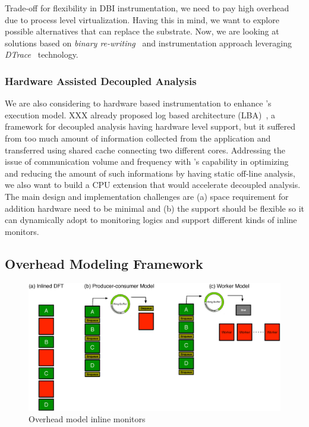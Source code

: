 Trade-off for flexibility in DBI instrumentation, we need to pay high
overhead due to process level virtualization. Having this in mind, we want to
explore possible alternatives that can replace the substrate. Now, we are
looking at solutions based on {\it binary re-writing}~\cite{cfi, rewriting} and
instrumentation approach leveraging {\it DTrace}~\cite{} technology.

\subsubsection{Hardware Assisted Decoupled Analysis} 
\label{}

We are also considering to hardware based instrumentation to enhance
\sreplica's execution model. XXX \etal already proposed log based architecture
(LBA)~\cite{lba}, a framework for decoupled analysis having hardware level
support, but it suffered from too much amount of information collected from the
application and transferred using shared cache connecting two different cores.
%
Addressing the issue of communication volume and frequency with \sreplica's
capability in optimizing and reducing the amount of such informations by having
static off-line analysis, we also want to build a CPU extension that would
accelerate decoupled analysis. 
%
The main design and implementation challenges are (a) space requirement for
addition hardware need to be minimal and (b) the support should be flexible so
it can dynamically adopt to monitoring logics and support different kinds of
inline monitors.

\subsection{Overhead Modeling Framework}

\begin{figure}[tb]
    \centering
    \includegraphics[width=0.90\linewidth]{figs/model0.eps}
    \caption{Overhead model inline monitors \label{fig:model0}}
\end{figure}


